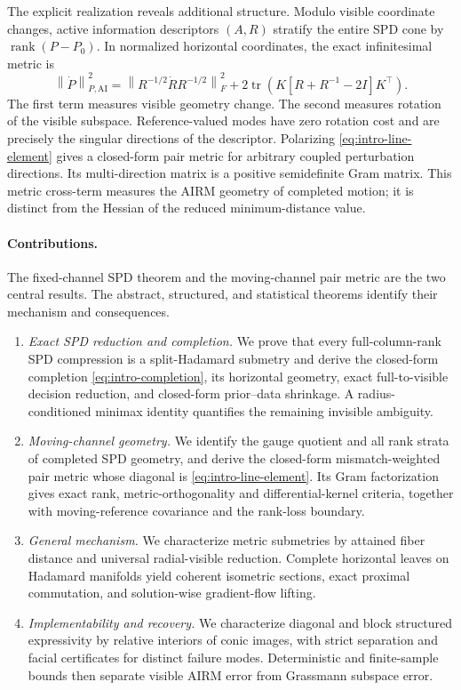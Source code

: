 \documentclass[10pt]{article}
\theoremstyle{plain}
\theoremstyle{definition}
\theoremstyle{remark}
\newcommand{\AI}{\mathrm{AI}}
\newcommand{\tr}{\operatorname{tr}}
\newcommand{\rank}{\operatorname{rank}}
\newcommand{\fro}[1]{\left\lVert #1\right\rVert_F}
\newcommand{\norm}[1]{\left\lVert #1\right\rVert}
\begin{document}
The explicit realization reveals additional structure.  Modulo visible
coordinate changes, active information descriptors \((A,R)\) stratify the
entire SPD cone by \(\rank(P-P_0)\).  In normalized horizontal coordinates,
the exact infinitesimal metric is
\begin{equation}
  \norm{\dot P}_{P,\AI}^2
  =
  \fro{R^{-1/2}\dot R R^{-1/2}}^2
  +2\tr\!\left(K[R+R^{-1}-2I]K^\top\right).
  \label{eq:intro-line-element}
\end{equation}
The first term measures visible geometry change.  The second measures rotation
of the visible subspace.  Reference-valued modes have zero rotation cost and
are precisely the singular directions of the descriptor.  Polarizing
\eqref{eq:intro-line-element} gives a closed-form pair metric for arbitrary
coupled perturbation directions.  Its multi-direction matrix is a positive
semidefinite Gram matrix.  This metric cross-term measures the AIRM geometry
of completed motion; it is distinct from the Hessian of the reduced
minimum-distance value.

\paragraph{Contributions.}
The fixed-channel SPD theorem and the moving-channel pair metric are the two
central results.  The abstract, structured, and statistical theorems identify
their mechanism and consequences.
\begin{enumerate}[leftmargin=*,itemsep=2pt]
  \item \emph{Exact SPD reduction and completion.}  We prove that every
  full-column-rank SPD compression is a
  split-Hadamard submetry and derive the closed-form completion
  \eqref{eq:intro-completion}, its horizontal geometry, exact full-to-visible
  decision reduction, and closed-form prior--data shrinkage.  A
  radius-conditioned minimax identity quantifies the remaining invisible
  ambiguity.
  \item \emph{Moving-channel geometry.}  We identify the gauge quotient and
  all rank strata of completed SPD geometry, and derive the closed-form
  mismatch-weighted pair metric whose diagonal is
  \eqref{eq:intro-line-element}.  Its Gram factorization gives exact rank,
  metric-orthogonality and differential-kernel criteria, together with
  moving-reference covariance and the rank-loss boundary.
  \item \emph{General mechanism.}  We characterize metric submetries by
  attained fiber distance and universal radial-visible reduction.  Complete
  horizontal leaves on Hadamard manifolds yield coherent isometric sections,
  exact proximal commutation, and solution-wise gradient-flow lifting.
  \item \emph{Implementability and recovery.}  We characterize diagonal and
  block structured expressivity by
  relative interiors of conic images, with strict separation and facial
  certificates for distinct failure modes.  Deterministic and finite-sample
  bounds then separate visible AIRM error from Grassmann subspace error.
\end{enumerate}
\end{document}

